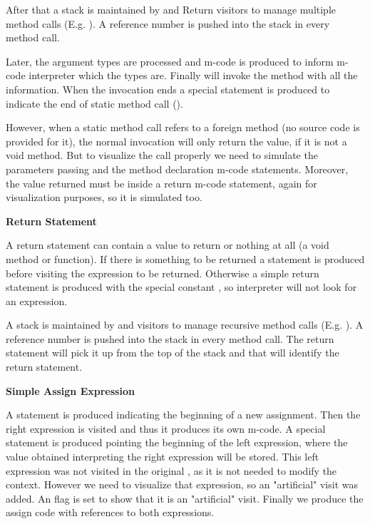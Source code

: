 After that a stack is maintained by  and Return
visitors to manage multiple method calls (E.g. ).
A reference number is pushed into the stack in every method call.

Later, the argument types are processed and m-code is produced to
inform m-code interpreter which the types are. Finally \djava{}
will invoke the method with all the information. When the invocation
ends a special statement is produced to indicate the end of static
method call ().

However, when a static method call refers to a foreign method
(no source code is provided for it), the normal invocation will only
return the value, if it is not a void method. But to visualize the
call properly we need to simulate the parameters passing and the
method declaration m-code statements. Moreover, the value returned
must be inside a return m-code statement, again for visualization
purposes, so it is simulated too.

{\bf{Return Statement}}

A return statement can contain a value to return or nothing at all
(a void method or function). If there is something to be returned a
 statement is produced before visiting the expression to be
returned. Otherwise a simple return statement is produced with the
special constant , so \jel{} interpreter will
not look for an expression.

A stack is maintained by  and  visitors
to manage recursive method calls (E.g. ).
A reference number is pushed into the stack in every method call.
The return statement will pick it up from the top of the stack and
that will identify the return statement.

{\bf{Simple Assign Expression}}

A  statement is produced indicating the beginning of a
new assignment. Then the right expression is visited and thus it
produces its own m-code. A special statement  is produced
pointing the beginning of the left expression, where the value
obtained interpreting the right expression will be stored. This
left expression was not visited in the original \djava{}, as
it is not needed to modify the context. However we need to visualize
that expression, so an "artificial" visit was added. An 
flag is set to show that it is an "artificial" visit. Finally we
produce the assign code with references to both expressions.

